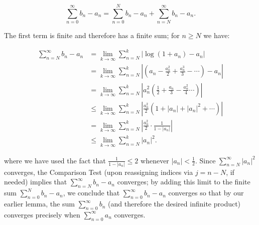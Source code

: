 \begin{solution}
  $$
  \sum_{n=0}^{\infty} b_n - a_n = \sum_{n=0}^{N} b_n - a_n + \sum_{n=N}^{\infty} b_n - a_n.
  $$

  \pagebreak
  The first term is finite and therefore has a finite sum; for $n \ge N$ we have:

  \begin{align*}
    \sum_{n=N}^{\infty} b_n - a_n
      &= \lim_{k \to \infty} \sum\limits_{n=N}^{k} \left| \log(1 + a_n) - a_n \right| \\
      &= \lim_{k \to \infty} \sum\limits_{n=N}^{k} \left| \left(a_n - \frac{a_n^2}{2} + \frac{a_n^3}{3} - \cdots\right) - a_n \right| \\
      &= \lim_{k \to \infty} \sum\limits_{n=N}^{k} \left| a_n^2 \left(\frac{1}{2} + \frac{a_n}{3} - \frac{a_n^2}{4} \cdots \right) \right| \\
      &\le \lim_{k \to \infty} \sum\limits_{n=N}^{k} \left| \frac{a_n^2}{2} \left(1 + |a_n| + |a_n|^2 + \cdots \right) \right| \\
      &= \lim_{k \to \infty} \sum\limits_{n=N}^{k} \left| \frac{a_n^2}{2} \cdot \frac{1}{1 - |a_n|} \right| \\
      &\le \lim_{k \to \infty} \sum\limits_{n=N}^{k} \left| a_n \right|^2.
  \end{align*}

  where we have used the fact that $\frac{1}{1 - |a_n|} \le 2$ whenever $|a_n| < \frac{1}{2}$. Since 
  $\sum\limits_{n=N}^{\infty} \left| a_n \right|^2$ converges, the Comparison Test (upon reassigning indices via 
  $j = n - N$, if needed) implies that $\sum\limits_{n=N}^{\infty} b_n - a_n$ converges; by adding this limit to the 
  finite sum $\sum\limits_{n=0}^{N} b_n - a_n$, we conclude that $\sum\limits_{n=0}^{\infty} b_n - a_n$ converges so 
  that by our earlier lemma, the sum $\sum\limits_{n=0}^{\infty} b_n$ (and therefore the desired infinite product) 
  converges precisely when $\sum\limits_{n=0}^{\infty} a_n$ converges.
  \ \\
\end{solution}